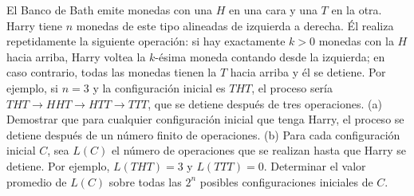 El Banco de Bath emite monedas con una $H$ en una cara y una $T$ en la otra. Harry tiene $n$ monedas de este tipo alineadas de izquierda a derecha. Él realiza repetidamente la siguiente operación: si hay exactamente $k \gt 0$ monedas con la $H$ hacia arriba, Harry voltea la $k$-ésima moneda contando desde la izquierda; en caso contrario, todas las monedas tienen la $T$ hacia arriba y él se detiene. Por ejemplo, si $n = 3$ y la configuración inicial es $THT$, el proceso sería $THT \to HHT \to HTT \to TTT$, que se detiene después de tres operaciones.
(a) Demostrar que para cualquier configuración inicial que tenga Harry, el proceso se detiene después de un número finito de operaciones.
(b) Para cada configuración inicial $C$, sea $L(C)$ el número de operaciones que se realizan hasta que Harry se detiene. Por ejemplo, $L(THT) = 3$ y $L(TTT) = 0$. Determinar el valor promedio de $L(C)$ sobre todas las $2^n$ posibles configuraciones iniciales de $C$.
